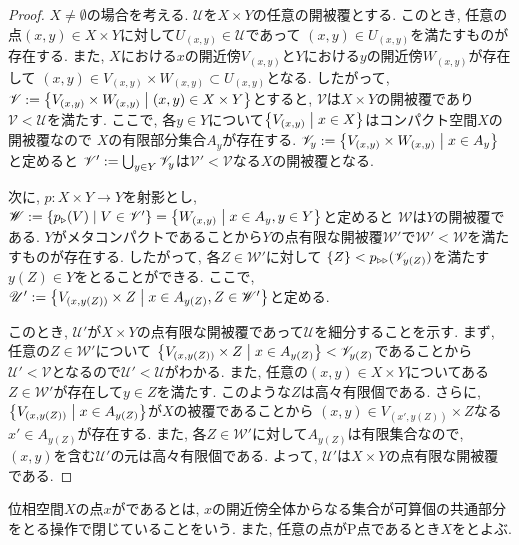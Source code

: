 \documentclass[uplatex, dvipdfmx, a4paper, 12pt, class=jsbook, crop=false]{standalone}
\begin{document}
\begin{proof}
	$ X \neq \emptyset $の場合を考える.
	$ \mathscr{U} $を$ X \times Y $の任意の開被覆とする. 
	このとき, 任意の点$ (x, y) \in X \times Y $に対して$ U_{(x, y)} \in \mathscr{U} $であって
	$ (x, y) \in U_{(x, y)} $を満たすものが存在する. 
	また, $ X $における$ x $の開近傍$ V_{(x, y)} $と$ Y $における$ y $の開近傍$ W_{(x, y)} $が存在して
	$ (x, y) \in V_{(x,y)} \times W_{(x, y)} \subset U_{(x, y)} $となる. 
	したがって, $ \mathscr{V} \defeq \setcomp{V_{(x, y)} \times W_{(x, y)}}{(x, y) \in X \times Y} $とすると, 
	$ \mathscr{V} $は$ X \times Y $の開被覆であり$ \mathscr{V} < \mathscr{U} $を満たす. 
	ここで, 各$ y \in Y $について$ \setcomp{V_{(x, y)}}{x \in X} $はコンパクト空間$ X $の開被覆なので
	$ X $の有限部分集合$ A_y $が存在する. 
	$ \mathscr{V}_y \defeq \setcomp{V_{(x, y)} \times W_{(x, y)}}{x \in A_y} $と定めると
	$ \mathscr{V}' \mathrel{:=} \bigcup_{y \in Y}\mathscr{V}_y $は$ \mathscr{V}' < \mathscr{V} $なる$ X $の開被覆となる. 
	
	次に, $ p \colon X \times Y \to Y $を射影とし, 
	$ \mathscr{W} \defeq \setcomp{p_{\imgto}(V)}{V \in \mathscr{V}'} 
	= \setcomp{W_{(x, y)}}{x \in A_y, y \in Y} $と定めると
	$ \mathscr{W} $は$ Y $の開被覆である. 
	$ Y $がメタコンパクトであることから$ Y $の点有限な開被覆$ \mathscr{W}' $で$ \mathscr{W}' < \mathscr{W} $を満たすものが存在する. 
	したがって, 各$ Z \in \mathscr{W}' $に対して
	$ \{Z\} <  p_{{}\triangleright{}{}\triangleright{}}(\mathscr{V}_{y(Z)}) $を満たす$ y(Z) \in Y $をとることができる. 
	ここで, $ \mathscr{U}' \defeq  \setcomp{V_{(x, y(Z))} \times Z}{x \in A_{y(Z)}, Z \in \mathscr{W}'} $と定める. 

	このとき, $ \mathscr{U}' $が$ X \times Y $の点有限な開被覆であって$ \mathscr{U} $を細分することを示す. 
	まず, 任意の$ Z \in \mathscr{W}' $について
	$ \setcomp{V_{(x, y(Z))} \times Z}{x \in A_{y(Z)}} < \mathscr{V}_{y(Z)} $であることから
	$ \mathscr{U}' < \mathscr{V} $となるので$ \mathscr{U}' < \mathscr{U} $がわかる. 
	また, 任意の$ (x, y) \in X \times Y $についてある$ Z \in \mathscr{W}' $が存在して$ y \in Z $を満たす. 
	このような$ Z $は高々有限個である. 
	さらに, $ \setcomp{V_{(x, y(Z))}}{x \in A_{y(Z)}} $が$ X $の被覆であることから
	$ (x, y) \in V_{(x', y(Z))} \times Z $なる$ x' \in A_{y(Z)} $が存在する. 
	また, 各$ Z \in \mathscr{W}' $に対して$ A_{y(Z)} $は有限集合なので, 
	$ (x, y) $を含む$ \mathscr{U}' $の元は高々有限個である. 
	よって, $ \mathscr{U}' $は$ X \times Y $の点有限な開被覆である.  
\end{proof}

\begin{definition}
	位相空間$ X $の点$ x $がであるとは, 
	$ x $の開近傍全体からなる集合が可算個の共通部分をとる操作で閉じていることをいう. 
	また, 任意の点がP点であるとき$ X $をとよぶ.
\end{definition}
\end{document}
